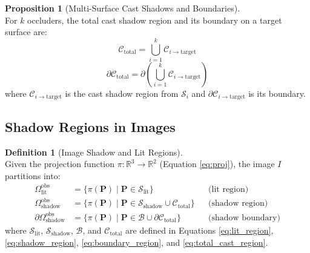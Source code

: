 \documentclass[12pt]{article}
\newcommand{\R}{\mathbb{R}}
\newcommand{\vect}[1]{\bm{#1}}
\theoremstyle{definition}
\newtheorem{definition}{Definition}[subsection]
\newtheorem{proposition}{Proposition}[subsection]
\begin{document}
\begin{proposition}[Multi-Surface Cast Shadows and Boundaries] \label{prop:multi_cast} ~\\
For $k$ occluders, the total cast shadow region and its boundary on a target surface are:
\begin{equation}
\boxed{\mathcal{C}_{\text{total}} = \bigcup_{i=1}^k \mathcal{C}_{i \to \text{target}} \label{eq:total_cast_region}}
\end{equation}
\begin{equation}
\boxed{\partial\mathcal{C}_{\text{total}} = \partial (\bigcup_{i=1}^k \mathcal{C}_{i \to \text{target}}) \label{eq:total_cast_boundary}}
\end{equation}
where $\mathcal{C}_{i \to \text{target}}$ is the cast shadow region from $\mathcal{S}_i$ and $\partial\mathcal{C}_{i \to \text{target}}$ is its boundary.
\end{proposition}

\subsection{Shadow Regions in Images} \label{sec:shadow_in_image}

\begin{definition}[Image Shadow and Lit Regions] \label{def:image_shadow_regions} ~\\
Given the projection function $\pi: \R^3 \to \R^2$ (Equation \eqref{eq:proj}), the image $I$ partitions into:
\begin{align}
\Omega_{\text{lit}}^{\text{obs}} &= \{\pi(\vect{P}) \mid \vect{P} \in \mathcal{S}_{\text{lit}}\} && \text{(lit region)} \label{eq:image_lit} \\
\Omega_{\text{shadow}}^{\text{obs}} &= \{\pi(\vect{P}) \mid \vect{P} \in \mathcal{S}_{\text{shadow}} \cup \mathcal{C}_{\text{total}}\} && \text{(shadow region)} \label{eq:image_shadow} \\
\partial\Omega_{\text{shadow}}^{\text{obs}} &= \{\pi(\vect{P}) \mid \vect{P} \in \mathcal{B} \cup \partial\mathcal{C}_{\text{total}}\} && \text{(shadow boundary)} \label{eq:image_boundary}
\end{align}
where $\mathcal{S}_{\text{lit}}$, $\mathcal{S}_{\text{shadow}}$, $\mathcal{B}$, and $\mathcal{C}_{\text{total}}$ are defined in Equations \eqref{eq:lit_region}, \eqref{eq:shadow_region}, \eqref{eq:boundary_region}, and \eqref{eq:total_cast_region}.
\end{definition}

\newpage
\end{document}
